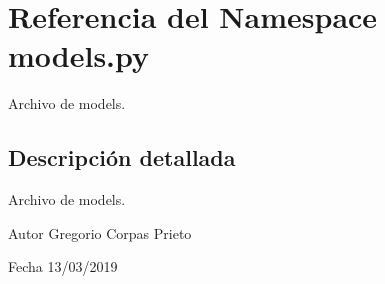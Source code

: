\hypertarget{namespacemodels_1_1py}{}\section{Referencia del Namespace models.\+py}
\label{namespacemodels_1_1py}


Archivo de models.  




\subsection{Descripción detallada}
Archivo de models. 

\begin{DoxyAuthor}{Autor}
Gregorio Corpas Prieto 
\end{DoxyAuthor}
\begin{DoxyDate}{Fecha}
13/03/2019 
\end{DoxyDate}

